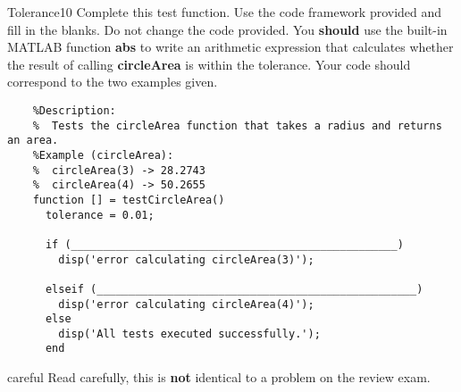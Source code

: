 \documentclass[master]{exam}
\begin{document}
\begin{problem}{Tolerance}{10}
    Complete this test function. Use the code framework provided and fill
    in the blanks. Do not change the code provided. You \textbf{should}
    use the built-in MATLAB function \textbf{abs} to write an arithmetic
    expression that calculates whether the result of
    calling \textbf{circleArea} is within the tolerance. Your code should
    correspond to the two examples given. 

    \begin{verbatim}
    %Description: 
    %  Tests the circleArea function that takes a radius and returns an area.
    %Example (circleArea):
    %  circleArea(3) -> 28.2743
    %  circleArea(4) -> 50.2655
    function [] = testCircleArea()
      tolerance = 0.01;

      if (___________________________________________________)
        disp('error calculating circleArea(3)');

      elseif (__________________________________________________)
        disp('error calculating circleArea(4)');
      else
        disp('All tests executed successfully.');
      end         
    \end{verbatim}
\end{problem}


\begin{block}{careful}
    Read carefully, this is \textbf{not} identical to a problem on the
    review exam.
\end{block}
\end{document}

